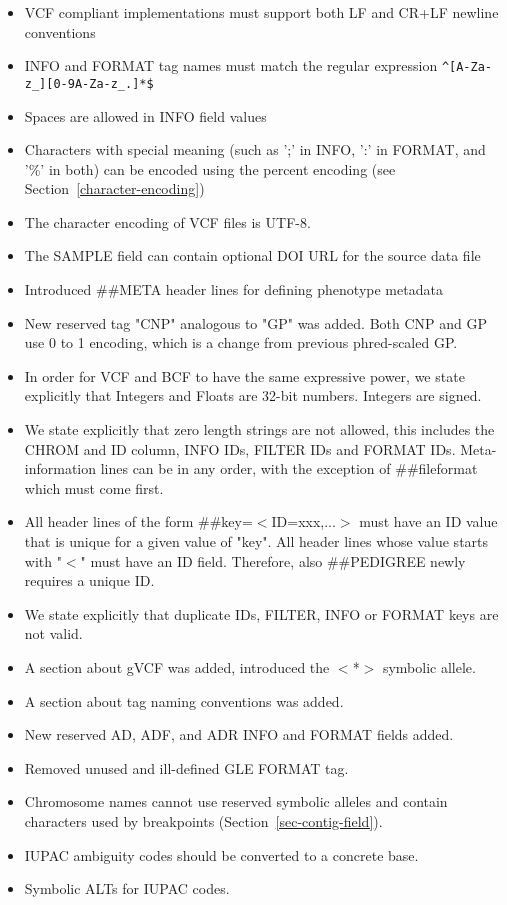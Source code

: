 \documentclass[8pt]{article}
\begin{document}
\begin{itemize}
\item VCF compliant implementations must support both LF and CR+LF newline conventions
\item INFO and FORMAT tag names must match the regular expression \texttt{\^{}[A-Za-z\_][0-9A-Za-z\_.]*\$}
\item Spaces are allowed in INFO field values
\item Characters with special meaning (such as ';' in INFO, ':' in FORMAT, and '\%' in both) can be encoded using the percent encoding (see Section~\ref{character-encoding})
\item The character encoding of VCF files is UTF-8.
\item The SAMPLE field can contain optional DOI URL for the source data file
\item Introduced \#\#META header lines for defining phenotype metadata
\item New reserved tag "CNP" analogous to "GP" was added. Both CNP and GP use 0 to 1 encoding, which is a change from previous phred-scaled GP.
\item In order for VCF and BCF to have the same expressive power, we state explicitly that Integers and Floats are 32-bit numbers. Integers are signed.
\item We state explicitly that zero length strings are not allowed, this includes the CHROM and ID column, INFO IDs, FILTER IDs and FORMAT IDs. Meta-information lines can be in any order, with the exception of \#\#fileformat which must come first. 
\item All header  lines of the form \#\#key=$<$ID=xxx,...$>$ must have an ID value
that is unique for a given value of "key". All header lines whose value starts
with "$<$" must have an ID field. Therefore, also \#\#PEDIGREE newly requires a unique ID.
\item We state explicitly that duplicate IDs, FILTER, INFO or FORMAT keys are not valid.
\item A section about gVCF was added, introduced the $<$*$>$ symbolic allele.
\item A section about tag naming conventions was added.
\item New reserved AD, ADF, and ADR INFO and FORMAT fields added.
\item Removed unused and ill-defined GLE FORMAT tag.
\item Chromosome names cannot use reserved symbolic alleles and contain characters used by breakpoints (Section~\ref{sec-contig-field}).
\item IUPAC ambiguity codes should be converted to a concrete base.
\item Symbolic ALTs for IUPAC codes.
\end{itemize}
\end{document}
